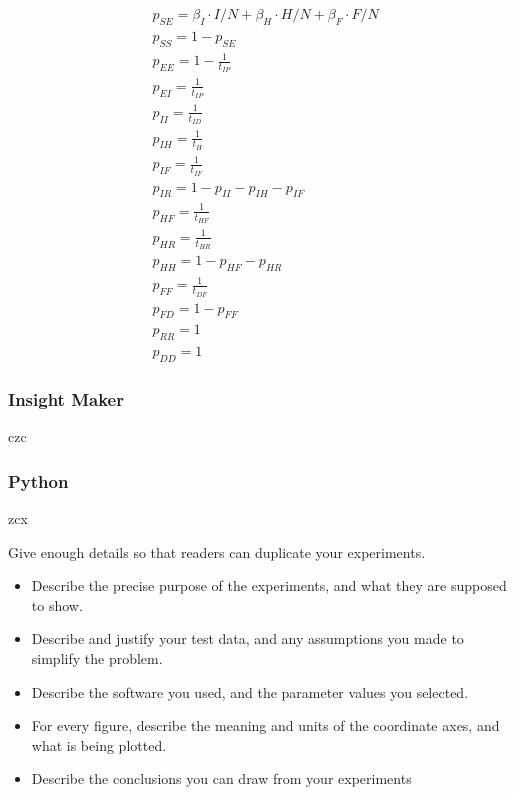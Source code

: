 \documentclass[10pt]{article}
\begin{document}
\begin{subequations}
\begin{alignat}{1}
&p_{SE}=\beta_I\cdot I/N+\beta_H\cdot H/N+\beta_F\cdot F/N\\
&p_{SS}=1-p_{SE}\\
&p_{EE}=1-\frac{1}{t_{IP}}\\
&p_{EI}=\frac{1}{t_{IP}}\\
&p_{II}=\frac{1}{t_{ID}}\\
&p_{IH}=\frac{1}{t_{H}}\\
&p_{IF}= \frac{1}{t_{IF}}\\
&p_{IR}=1-p_{II}-p_{IH}-p_{IF}\\
&p_{HF}=\frac{1}{t_{HF}}\\
&p_{HR}=\frac{1}{t_{HR}}\\
&p_{HH}=1-p_{HF}-p_{HR}\\
&p_{FF}=\frac{1}{t_{DF}}\\
&p_{FD}=1-p_{FF}\\
&p_{RR}=1\\
&p_{DD}=1
\end{alignat}
\end{subequations}

\subsubsection{Insight Maker}
czc

\subsubsection{Python}
zcx


Give enough details so that readers can duplicate your experiments.

\begin{itemize}
\item Describe the precise purpose of the experiments, and what they 
are supposed to show.

\item Describe and justify your test data, and any assumptions you made to 
simplify the problem.

\item Describe the software you used, and the 
parameter values you selected.

\item 
For every figure, describe the meaning and units of the coordinate axes, 
and what is being plotted.

\item Describe the conclusions you can draw from your experiments
\end{itemize}
\end{document}
